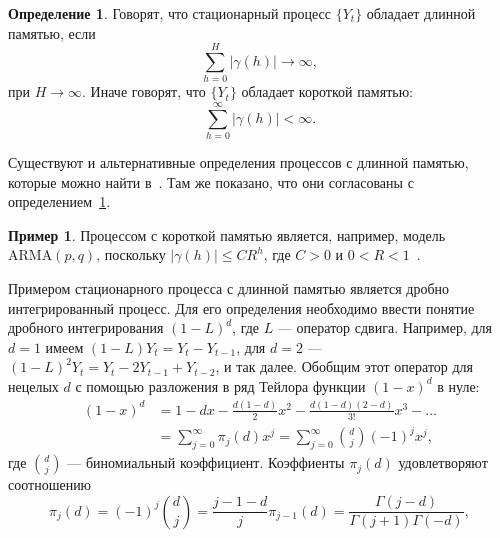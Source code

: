 \documentclass[specialist,
substylefile = spbu_report.rtx,
subf,href,colorlinks=true, 12pt]{disser}
\theoremstyle{definition}
\newtheorem{definition}{Определение}[section]
\newtheorem{example}{Пример}[section]
\begin{document}
\begin{definition}\label{def:longmemory}
	Говорят, что стационарный процесс $\{Y_t\}$ обладает длинной памятью, если
	\[
		\sum_{h=0}^H|\gamma(h)|\to\infty,
	\]
	при $H\to\infty$. Иначе говорят, что $\{Y_t\}$ обладает короткой памятью:
	\[
		\sum_{h=0}^\infty|\gamma(h)|<\infty.
	\]
\end{definition}
Существуют и альтернативные определения процессов с длинной памятью, которые можно найти в~\cite[Section 3.1]{Palma2006}. Там же показано, что они согласованы с определением~\ref{def:longmemory}.
\begin{example}
	Процессом с короткой памятью является, например, модель $\mathrm{ARMA}(p, q)$, поскольку $|\gamma(h)|\leqslant CR^h$, где $C>0$ и $0<R<1$~\cite{BoxJenkins2016}.
\end{example}
Примером стационарного процесса с длинной памятью является дробно интегрированный процесс. Для его определения необходимо ввести понятие дробного интегрирования $(1-L)^d$, где $L$ --- оператор сдвига. Например, для $d=1$ имеем $(1-L)Y_t=Y_t-Y_{t-1}$, для $d=2$ --- $(1-L)^2Y_t=Y_t-2Y_{t-1}+Y_{t-2}$, и так далее. Обобщим этот оператор для нецелых $d$ с помощью разложения в ряд Тейлора функции $(1-x)^d$ в нуле:
\[
	\begin{aligned}
		(1-x)^d & =1-dx-\frac{d(1-d)}{2}x^2-\frac{d(1-d)(2-d)}{3!}x^3-\ldots             \\
		        & =\sum_{j=0}^\infty \pi_j(d)x^j=\sum_{j=0}^\infty\binom{d}{j}(-1)^jx^j,
	\end{aligned}
\]
где $\binom{d}{j}$ --- биномиальный коэффициент. Коэффиенты $\pi_j(d)$ удовлетворяют соотношению
\begin{equation}\label{eq:pi_j}
	\pi_j(d)=(-1)^j\binom{d}{j}=\frac{j-1-d}{j}\pi_{j-1}(d)=\frac{\Gamma(j-d)}{\Gamma(j+1)\Gamma(-d)},
\end{equation}
\end{document}
